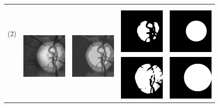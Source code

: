 \begin{figure}[h]
\begin{tabular}{c c c c c}
        {} & {} & {} & {} & {} \\
        {} & {} & {} & {} & {} \\
        
        {} & {} & {} & \multirow{2}{*}{\includegraphics[width=2.5cm]{Images/Results/Segmentation/drishti69/2_cup.png}} & 
        \multirow{2}{*}{\includegraphics[width=2.5cm]{Images/Results/Segmentation/drishti69/6_hough_cup.png}} \\
        
        {(2)} & \multirow{2}{*}{\includegraphics[width=2.5cm]{Images/Results/Segmentation/drishti69/0_crop.png}} & 
        \multirow{2}{*}{\includegraphics[width=2.5cm]{Images/Results/Segmentation/drishti69/1_kmeans.png}} & {} & {} \\
        
        {} & {} & {} & \multirow{2}{*}{\includegraphics[width=2.5cm]{Images/Results/Segmentation/drishti69/3_do.png}} & 
        \multirow{2}{*}{\includegraphics[width=2.5cm]{Images/Results/Segmentation/drishti69/7_hough_do.png}} \\
        

\end{tabular}
\end{figure}
